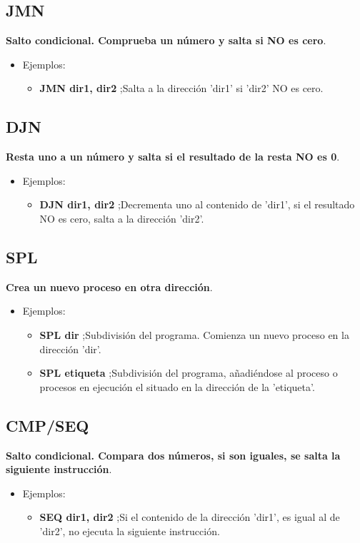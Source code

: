 \subsection{JMN}
\textbf{Salto condicional. Comprueba un número y salta si NO es cero}.
\begin{itemize}
    \item Ejemplos:
    \begin{itemize}
        \item \textbf{JMN dir1, dir2} ;Salta a la dirección 'dir1' si 'dir2' NO es cero.
    \end{itemize}
\end{itemize}

\subsection{DJN}
\textbf{Resta uno a un número y salta si el resultado de la resta NO es 0}.
\begin{itemize}
    \item Ejemplos:
    \begin{itemize}
        \item \textbf{DJN dir1, dir2} ;Decrementa uno al contenido de 'dir1', si el resultado NO es cero, salta a la dirección 'dir2'.
    \end{itemize}
\end{itemize}

\subsection{SPL}
\textbf{Crea un nuevo proceso en otra dirección}.
\begin{itemize}
    \item Ejemplos:
    \begin{itemize}
        \item \textbf{SPL dir} ;Subdivisión del programa. Comienza un nuevo proceso en la dirección 'dir'.
        \item \textbf{SPL etiqueta} ;Subdivisión del programa, añadiéndose al proceso o procesos en ejecución el situado en la dirección de la 'etiqueta'.
    \end{itemize}
\end{itemize}

\subsection{CMP/SEQ}
\textbf{Salto condicional. Compara dos números, si son iguales, se salta la siguiente instrucción}.
\begin{itemize}
    \item Ejemplos:
    \begin{itemize}
        \item \textbf{SEQ dir1, dir2} ;Si el contenido de la dirección 'dir1', es igual al de 'dir2', no ejecuta la siguiente instrucción.
    \end{itemize}
\end{itemize}

